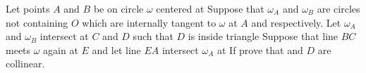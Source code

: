 Let points $A$ and $B$ be on circle $\omega$ centered at  Suppose that $\omega_A$ and $\omega_B$ are circles not containing $O$ which are internally tangent to $\omega$ at $A$ and  respectively. Let $\omega_A$ and $\omega_B$ intersect at $C$ and $D$ such that $D$ is inside triangle  Suppose that line $BC$ meets $\omega$ again at $E$ and let line $EA$ intersect $\omega_A$ at  If  prove that   and $D$ are collinear.